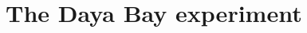 \documentclass[../thesis.tex]{subfiles}
\begin{document}
\chapter{The Daya Bay experiment}
\label{chap:experim}
\end{document}
